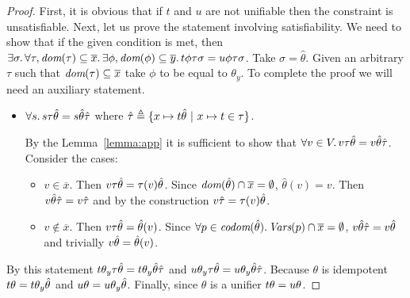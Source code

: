 \begin{proof}
  First, it is obvious that if $t$ and $u$ are not unifiable then the constraint is unsatisfiable.
  Next, let us prove the statement involving satisfiability.
  We need to show that if the given condition is met, then 
  ${\exists \sigma\ldotp 
    \forall \tau, \dom{\tau} \subseteq \overline{x}\ldotp 
    \exists \phi, \dom{\phi} \subseteq \overline{y}\ldotp 
    \sapp{\sigma}{\sapp{\tau}{\sapp{\phi}{t}}} = \sapp{\sigma}{\sapp{\tau}{\sapp{\phi}{u}}}
  }$.
  Take $\sigma = \hat{\theta}$. 
  Given an arbitrary $\tau$ such that $\dom{\tau} \subseteq \overline{x}$ take $\phi$ to be equal to $\theta_y$.
  To complete the proof we will need an auxiliary statement.
  \begin{itemize}
    \item $\forall s\ldotp \sapp{\hat{\theta}}{\sapp{\tau}{s}} = \sapp{\hat{\tau}}{\sapp{\hat{\theta}}{s}}$
      where $\hat{\tau} \defeq \{x \mapsto \sapp{\hat{\theta}}{t} ~|~ x \mapsto t \in \tau \}$.
    \begin{subproof}
      By the Lemma~\ref{lemma:app} it is sufficient to show that
      $\forall v \in V\ldotp \sapp{\hat{\theta}}{\sapp{\tau}{v}} = \sapp{\hat{\tau}}{\sapp{\hat{\theta}}{v}}$.
      Consider the cases:
      \begin{itemize}
        \item $v \in \overline{x}$. Then $\sapp{\hat{\theta}}{\sapp{\tau}{v}} = \sapp{\hat{\theta}}{\tau(v)}$.
          Since $\dom{\hat{\theta}} \cap \overline{x} = \emptyset$, $\hat{\theta}(v) = v$.
          Then $\sapp{\hat{\tau}}{\sapp{\hat{\theta}}{v}} = \sapp{\hat{\tau}}{v}$ 
          and by the construction $\sapp{\hat{\tau}}{v} = \sapp{\hat{\theta}}{\tau(v)}$.
        \item $v \not\in \overline{x}$. Then $\sapp{\hat{\theta}}{\sapp{\tau}{v}} = \hat{\theta}(v)$.
          Since $\forall p \in \codom{\hat{\theta}}\ldotp \vars{p} \cap \overline{x} = \emptyset$, 
          $\sapp{\hat{\tau}}{\sapp{\hat{\theta}}{v}} = \sapp{\hat{\theta}}{v}$ 
          and trivially $\sapp{\hat{\theta}}{v} = \hat{\theta}(v)$.
      \end{itemize}
    \end{subproof}
  \end{itemize}

  By this statement 
  $\sapp{\hat{\theta}}{\sapp{\tau}{\sapp{\theta_y}{t}}} = \sapp{\hat{\tau}}{\sapp{\hat{\theta}}{\sapp{\theta_y}{t}}}$
  and 
  $\sapp{\hat{\theta}}{\sapp{\tau}{\sapp{\theta_y}{u}}} = \sapp{\hat{\tau}}{\sapp{\hat{\theta}}{\sapp{\theta_y}{u}}}$.
  Because $\theta$ is idempotent $\sapp{\theta}{t} = \sapp{\hat{\theta}}{\sapp{\theta_y}{t}}$ 
  and $\sapp{\theta}{u} = \sapp{\hat{\theta}}{\sapp{\theta_y}{u}}$. 
  Finally, since $\theta$ is a unifier $\sapp{\theta}{t} = \sapp{\theta}{u}$.


\end{proof}
